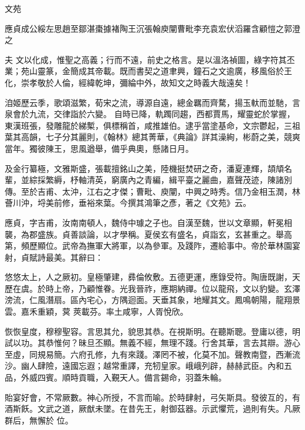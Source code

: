 
\begin{pinyinscope}

 文苑



 應貞成公綏左思趙至鄒湛棗據褚陶王沉張翰庾闡曹毗李充袁宏伏滔羅含顧愷之郭澄之



 夫
 文以化成，惟聖之高義；行而不遠，前史之格言。是以溫洛禎圖，綠字符其丕業；苑山靈篆，金簡成其帝載。既而書契之道聿興，鐘石之文逾廣，移風俗於王化，崇孝敬於人倫，經緯乾坤，彌綸中外，故知文之時義大哉遠矣！



 洎姬歷云季，歌頌滋繁，荀宋之流，導源自遠，總金羈而齊騖，揚玉軑而並馳，言泉會於九流，交律詣於六變。
 自時已降，軌躅同趨，西都賈馬，耀靈蛇於掌握，東漢班張，發雕龍於綈槧，俱標稱首，咸推雄伯。逮乎當塗基命，文宗鬱起，三祖葉其高韻，七子分其麗則，《翰林》總其菁華，《典論》詳其澡絢，彬蔚之美，競爽當年。獨彼陳王，思風遒舉，備乎典奧，懸諸日月。



 及金行纂極，文雅斯盛，張載擅銘山之美，陸機挺焚研之奇，潘夏連輝，頡頏名輩，並綜採繁縟，杼軸清英，窮廣內之青編，緝平臺之麗曲，嘉聲茂迹，陳諸別傳。至於吉甫、太沖，江右之才傑；曹毗、庾闡，中興之時秀。信乃金相玉潤，林薈川沖，埒美前修，垂裕來葉。今撰其鴻筆之彥，著之《文苑》云。



 應貞，字吉甫，汝南南頓人，魏侍中璩之子也。自漢至魏，世以文章顯，軒冕相襲，為郡盛族。貞善談論，以才學稱。夏侯玄有盛名，貞詣玄，玄甚重之。舉高第，頻歷顯位。武帝為撫軍大將軍，以為參軍。及踐阼，遷給事中。帝於華林園宴射，貞賦詩最美。其辭曰：



 悠悠太上，人之厥初。皇極肇建，彞倫攸敷。五德更運，應錄受符。陶唐既謝，天歷在虞。於時上帝，乃顧惟眷。光我晉祚，應期納禪。位以龍飛，文以豹變。玄澤滂流，仁風潛扇。區內宅心，方隅迴面。天垂其象，地耀其文。鳳鳴朝陽，龍翔景雲。嘉禾重穎，蓂
 莢載芬。率土咸寧，人胥悅欣。



 恢恢皇度，穆穆聖容。言思其允，貌思其恭。在視斯明。在聽斯聰。登庸以德，明試以功。其恭惟何？昧旦丕顯。無義不經，無理不踐。行舍其華，言去其辯。游心至虛，同規易簡。六府孔修，九有來踐。澤罔不被，化莫不加。聲教南暨，西漸流沙。幽人肆險，遠國忘遐；越常重譯，充牣皇家。峨峨列辟，赫赫武臣。內和五品，外威四賓。順時貢職，入覲天人。備言錫命，羽蓋朱輪。



 貽宴好會，不常厥數。神心所授，不言而喻。於時肆射，弓矢斯具。發彼互的，有酒斯飫。文武之道，厥猷未墜。在昔先王，射御茲器。示武懼荒，過則有失。凡厥群后，無懈於
 位。




\end{pinyinscope}
